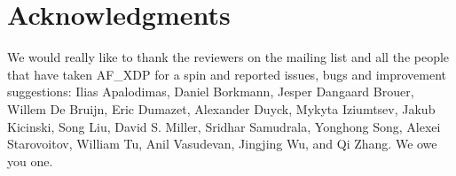 \documentclass[9pt,numbers,reprint]{sigplanconf}
\begin{document}
\section{Acknowledgments}
\label{sec:thanks}

We would really like to thank the reviewers on the mailing list and
all the people that have taken AF\_XDP for a spin and reported issues,
bugs and improvement suggestions: Ilias Apalodimas, Daniel Borkmann,
Jesper Dangaard Brouer, Willem De Bruijn, Eric Dumazet, Alexander
Duyck, Mykyta Iziumtsev, Jakub Kicinski, Song Liu, David S. Miller,
Sridhar Samudrala, Yonghong Song, Alexei Starovoitov, William Tu, Anil
Vasudevan, Jingjing Wu, and Qi Zhang. We owe you one.



\end{document}
